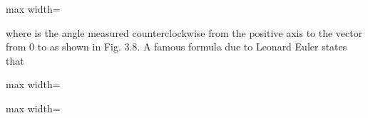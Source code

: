 \documentclass[11pt,oneside]{article}
\begin{document}
\begin{BookBody}
\begin{center}\begin{adjustbox}{max width=\linewidth}\end{adjustbox}\end{center}

\noindent where \BookInline{\theta } is the angle measured counterclockwise from the positive axis to the vector from 0 to  as shown in Fig. 3.8. A famous formula due to Leonard Euler states that

\begin{center}\begin{adjustbox}{max width=\linewidth}\end{adjustbox}\end{center}

\begin{center}\begin{adjustbox}{max width=\linewidth}\end{adjustbox}\end{center}

\end{BookBody}

\BookNarrativetrue
\end{document}
